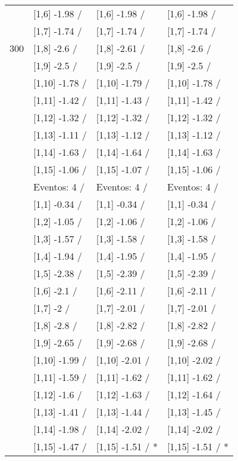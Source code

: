 \begin{table}
\begin{tabular}[t]{llll}
 & {}[1,6] -1.98  / & {}[1,6] -1.98  / & {}[1,6] -1.98  /\\
 & {}[1,7] -1.74  / & {}[1,7] -1.74  / & {}[1,7] -1.74  /\\
300 & {}[1,8] -2.6  / & {}[1,8] -2.61  / & {}[1,8] -2.6  /\\
\addlinespace
 & {}[1,9] -2.5  / & {}[1,9] -2.5  / & {}[1,9] -2.5  /\\
 & {}[1,10] -1.78  / & {}[1,10] -1.79  / & {}[1,10] -1.78  /\\
 & {}[1,11] -1.42  / & {}[1,11] -1.43  / & {}[1,11] -1.42  /\\
 & {}[1,12] -1.32  / & {}[1,12] -1.32  / & {}[1,12] -1.32  /\\
 & {}[1,13] -1.11  / & {}[1,13] -1.12  / & {}[1,13] -1.12  /\\
\addlinespace
 & {}[1,14] -1.63  / & {}[1,14] -1.64  / & {}[1,14] -1.63  /\\
 & {}[1,15] -1.06  / & {}[1,15] -1.07  / & {}[1,15] -1.06  /\\
 & Eventos:  4 / & Eventos:  4 / & Eventos:  4 /\\
 & {}[1,1] -0.34  / & {}[1,1] -0.34  / & {}[1,1] -0.34  /\\
 & {}[1,2] -1.05  / & {}[1,2] -1.06  / & {}[1,2] -1.06  /\\
\addlinespace
 & {}[1,3] -1.57  / & {}[1,3] -1.58  / & {}[1,3] -1.58  /\\
 & {}[1,4] -1.94  / & {}[1,4] -1.95  / & {}[1,4] -1.95  /\\
 & {}[1,5] -2.38  / & {}[1,5] -2.39  / & {}[1,5] -2.39  /\\
 & {}[1,6] -2.1  / & {}[1,6] -2.11  / & {}[1,6] -2.11  /\\
 & {}[1,7] -2  / & {}[1,7] -2.01  / & {}[1,7] -2.01  /\\
\addlinespace
500 & {}[1,8] -2.8  / & {}[1,8] -2.82  / & {}[1,8] -2.82  /\\
 & {}[1,9] -2.65  / & {}[1,9] -2.68  / & {}[1,9] -2.68  /\\
 & {}[1,10] -1.99  / & {}[1,10] -2.01  / & {}[1,10] -2.02  /\\
 & {}[1,11] -1.59  / & {}[1,11] -1.62  / & {}[1,11] -1.62  /\\
 & {}[1,12] -1.6  / & {}[1,12] -1.63  / & {}[1,12] -1.64  /\\
\addlinespace
 & {}[1,13] -1.41  / & {}[1,13] -1.44  / & {}[1,13] -1.45  /\\
 & {}[1,14] -1.98  / & {}[1,14] -2.02  / & {}[1,14] -2.02  /\\
 & {}[1,15] -1.47  / & {}[1,15] -1.51  / * & {}[1,15] -1.51  / *\\
\bottomrule
\end{tabular}
\end{table}

